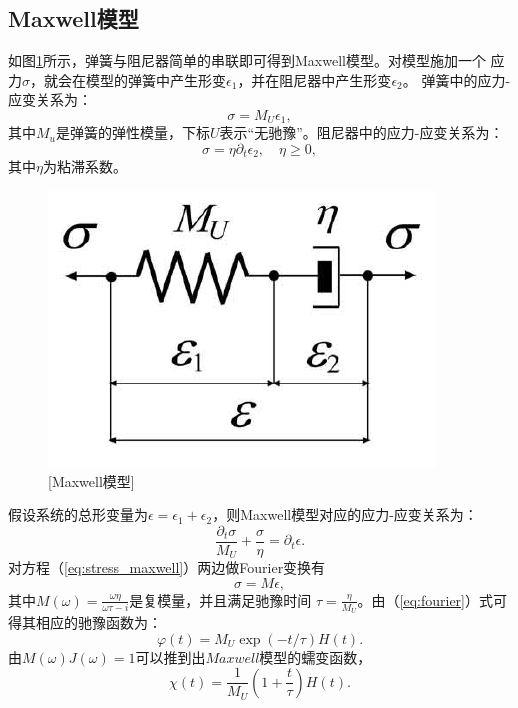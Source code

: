 \subsection{Maxwell模型}
\vspace{0.2cm}
如图\ref{fig:maxwell_model}所示，弹簧与阻尼器简单的串联即可得到Maxwell模型。对模型施加一个
应力$\sigma$，就会在模型的弹簧中产生形变$\epsilon_1$，并在阻尼器中产生形变$\epsilon_2$。
弹簧中的应力-应变关系为：
\begin{equation}
	\sigma=M_U\epsilon_1,
\end{equation}
其中$M_u$是弹簧的弹性模量，下标$U$表示“无驰豫”。阻尼器中的应力-应变关系为：
\begin{equation}
	\sigma=\eta\partial_t \epsilon_2, \quad \eta\geq0,
\end{equation}
其中$\eta$为粘滞系数。
\begin{figure}[!htbp]
	    \centering
		\includegraphics[width=0.6\linewidth]{figure/maxwell_model}
	    [Maxwell模型]
		\label{fig:maxwell_model}
\end{figure}
假设系统的总形变量为$\epsilon=\epsilon_1+\epsilon_2$，则Maxwell模型对应的应力-应变关系为：
\begin{equation}
	\frac{\partial_t\sigma}{M_U}+\frac{\sigma}{\eta}=\partial_t\epsilon.
	\label{eq:stress_maxwell}
\end{equation}
对方程（\ref{eq:stress_maxwell}）两边做Fourier变换有
\begin{equation}
	\sigma=M\epsilon,
\end{equation}
其中$M(\omega)=\frac{\omega\eta}{\omega\tau-i}$是复模量，并且满足驰豫时间
$\tau=\frac{\eta}{M_U}$。由（\ref{eq:fourier}）式可得其相应的驰豫函数为：
\begin{equation}
	\varphi(t)=M_U\exp(-t/\tau)H(t).
\end{equation}
由$M(\omega)J(\omega)=1$可以推到出$Maxwell$模型的蠕变函数，
\begin{equation}
	\chi(t)=\frac{1}{M_U}(1+\frac{t}{\tau})H(t).
\end{equation}
